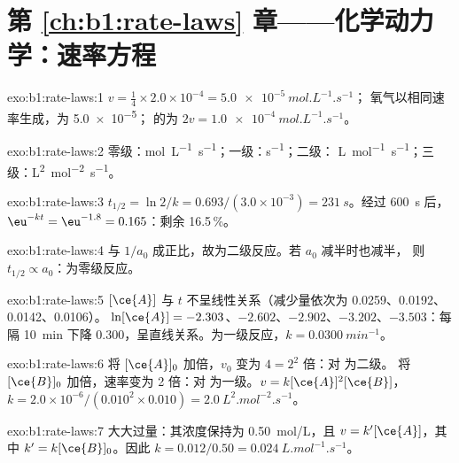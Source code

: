 \section*{第 \ref{ch:b1:rate-laws} 章——化学动力学：速率方程}

\begin{solution}{exo:b1:rate-laws:1}
$v = \frac14 \times 2.0 \times 10^{-4} = \qty{5.0e-5}{mol.L^{-1}.s^{-1}}$；
氧气以相同速率生成，为 \qty{5.0e-5}{}； 的为
$2v = \qty{1.0e-4}{mol.L^{-1}.s^{-1}}$。
\end{solution}

\begin{solution}{exo:b1:rate-laws:2}
零级：\unit{mol.L^{-1}.s^{-1}}；一级：\unit{s^{-1}}；二级：
\unit{L.mol^{-1}.s^{-1}}；三级：\unit{L^2.mol^{-2}.s^{-1}}。
\end{solution}

\begin{solution}{exo:b1:rate-laws:3}
$t_{1/2} = \ln2/k = 0.693/(3.0 \times 10^{-3}) = \qty{231}{s}$。经过
\qty{600}{s} 后，$\eu^{-kt} = \eu^{-1.8} = 0.165$：剩余 16.5\,\%。
\end{solution}

\begin{solution}{exo:b1:rate-laws:4}
与 $1/a_0$ 成正比，故为二级反应。若 $a_0$ 减半时也减半，
则 $t_{1/2} \propto a_0$：为零级反应。
\end{solution}

\begin{solution}{exo:b1:rate-laws:5}
$[\ce{A}]$ 与 $t$ 不呈线性关系（减少量依次为 0.0259、0.0192、0.0142、0.0106）。
$\ln[\ce{A}] = -2.303$、$-2.602$、$-2.902$、$-3.202$、$-3.503$：每隔
\qty{10}{min} 下降 0.300，呈直线关系。为一级反应，$k =
\qty{0.0300}{min^{-1}}$。
\end{solution}

\begin{solution}{exo:b1:rate-laws:6}
将 $[\ce{A}]_0$ 加倍，$v_0$ 变为 $4 = 2^2$ 倍：对  为二级。
将 $[\ce{B}]_0$ 加倍，速率变为 2 倍：对  为一级。$v =
k[\ce{A}]^2[\ce{B}]$，$k = 2.0 \times 10^{-6}/(0.010^2 \times 0.010) =
\qty{2.0}{L^2.mol^{-2}.s^{-1}}$。
\end{solution}

\begin{solution}{exo:b1:rate-laws:7}
 大大过量：其浓度保持为
\qty{0.50}{mol/L}，且 $v = k'[\ce{A}]$，其中 $k' = k[\ce{B}]_0$。因此
$k = 0.012/0.50 = \qty{0.024}{L.mol^{-1}.s^{-1}}$。
\end{solution}

